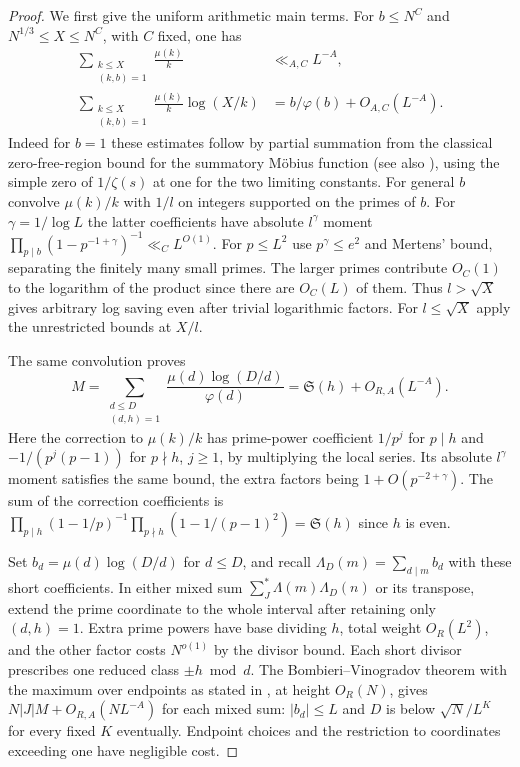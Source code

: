 \documentclass[11pt,a4paper]{article}
\numberwithin{equation}{section}
\newcommand{\SSS}{\mathfrak S}
\begin{document}
\begin{proof}
We first give the uniform arithmetic main terms. For $b\le N^C$
and $N^{1/3}\le X\le N^C$, with $C$ fixed, one has
\begin{align*}
 \sum_{\substack{k\le X\\(k,b)=1}}\frac{\mu(k)}{k}
    &\ll_{A,C} L^{-A},\\
 \sum_{\substack{k\le X\\(k,b)=1}}\frac{\mu(k)}{k}\log(X/k)
    &= b/\varphi(b)+O_{A,C}(L^{-A}).
\end{align*}
Indeed for $b=1$ these estimates follow by partial summation from
the classical zero-free-region bound for the summatory M\"obius
function (see also \cite{LeeLeongMertens}), using the simple
zero of $1/\zeta(s)$ at one for the
two limiting constants. For general $b$ convolve $\mu(k)/k$
with $1/l$ on integers supported on the primes of $b$.
For $\gamma=1/\log L$ the latter coefficients have absolute
$l^\gamma$ moment $\prod_{p\mid b}(1-p^{-1+\gamma})^{-1}
\ll_C L^{O(1)}$. For $p\le L^2$ use $p^\gamma\le e^2$ and
Mertens' bound, separating the finitely many small primes. The
larger primes contribute $O_C(1)$ to the logarithm of the product
since there are $O_C(L)$ of them. Thus $l>\sqrt X$ gives
arbitrary log saving even after trivial logarithmic factors.
For $l\le\sqrt X$ apply the unrestricted bounds at $X/l$.

The same convolution proves
\[
 M=\sum_{\substack{d\le D\\(d,h)=1}}
      \frac{\mu(d)\log(D/d)}{\varphi(d)}
      =\SSS(h)+O_{R,A}(L^{-A}).
\]
Here the correction to $\mu(k)/k$ has prime-power coefficient
$1/p^j$ for $p\mid h$ and $-1/(p^j(p-1))$ for $p\nmid h$,
$j\ge1$, by multiplying the local series. Its absolute
$l^\gamma$ moment satisfies the same bound, the extra factors
being $1+O(p^{-2+\gamma})$. The sum of the correction coefficients
is $\prod_{p\mid h}(1-1/p)^{-1}
\prod_{p\nmid h}(1-1/(p-1)^2)=\SSS(h)$ since $h$ is even.

Set $b_d=\mu(d)\log(D/d)$ for $d\le D$, and recall
$\Lambda_D(m)=\sum_{d\mid m}b_d$ with these short coefficients.
In either mixed sum $\sum_J^*\Lambda(m)\Lambda_D(n)$ or its
transpose, extend the prime coordinate to the whole interval
after retaining only $(d,h)=1$. Extra prime powers have base
dividing $h$, total weight $O_R(L^2)$, and the other factor costs
$N^{o(1)}$ by the divisor bound. Each short divisor prescribes
one reduced class $\pm h\bmod d$. The Bombieri--Vinogradov
theorem with the maximum over endpoints as stated in
\cite[Introduction]{AkbaryHambrook}, at height $O_R(N)$,
gives $N|J|M+O_{R,A}(NL^{-A})$ for each mixed sum: $|b_d|\le L$
and $D$ is below $\sqrt N/L^K$ for every fixed $K$ eventually.
Endpoint choices and the restriction to coordinates exceeding
one have negligible cost.


\end{proof}
\end{document}
